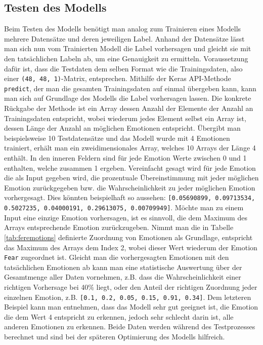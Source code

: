 \documentclass[12pt, a4paper]{report}
\begin{document}
\subsection{Testen des Modells}
Beim Testen des Modells benötigt man analog zum Trainieren eines Modells mehrere Datensätze und deren jeweiligen Label. Anhand der Datensätze lässt man sich nun vom Trainierten Modell die Label vorhersagen und gleicht sie mit den tatsächlichen Labeln ab, um eine Genauigkeit zu ermitteln. Voraussetzung dafür ist, dass die Testdaten dem selben Format wie die Trainingsdaten, also einer \texttt{(48, 48, 1)}-Matrix, entsprechen. Mithilfe der Keras API-Methode \texttt{predict}, der man die gesamten Trainingsdaten auf einmal übergeben kann, kann man sich auf Grundlage des Modells die Label vorhersagen lassen. Die konkrete Rückgabe der Methode ist ein Array dessen Anzahl der Elemente der Anzahl an Trainingsdaten entspricht, wobei wiederum jedes Element selbst ein Array ist, dessen Länge der Anzahl an möglichen Emotionen entspricht. Übergibt man beispielsweise 10 Testdatensätze und das Modell wurde mit 4 Emotionen trainiert, erhält man ein zweidimensionales Array, welches 10 Arrays der Länge 4 enthält. In den inneren Feldern sind für jede Emotion Werte zwischen 0 und 1 enthalten, welche zusammen 1 ergeben. Vereinfacht gesagt wird für jede Emotion die als Input gegeben wird, die prozentuale Übereinstimmung mit jeder möglichen Emotion zurückgegeben bzw. die Wahrscheinlichkeit zu jeder möglichen Emotion vorhergesagt. Dies könnten beispielhaft so aussehen: \texttt{[0.05690899, 0.09713534, 0.5027235,  0.04000191, 0.29613075, 0.00709949]}. Möchte man zu einem Input eine einzige Emotion vorhersagen, ist es sinnvoll, die dem Maximum des Arrays entsprechende Emotion zurückzugeben. Nimmt man die in Tabelle \ref{tab:feremotions} definierte Zuordnung von Emotionen als Grundlage, entspricht das Maximum des Arrays dem Index 2, wobei dieser Wert wiederum der Emotion \texttt{Fear} zugeordnet ist.\newline
Gleicht man die vorhergesagten Emotionen mit den tatsächlichen Emotionen ab kann man eine statistische Auswertung über der Gesamtmenge aller Daten vornehmen, z.B. dass die Wahrscheinlichkeit einer richtigen Vorhersage bei 40\% liegt, oder den Anteil der richtigen Zuordnung jeder einzelnen Emotion, z.B. \texttt{[0.1, 0.2, 0.05, 0.15, 0.91, 0.34]}. Dem letzteren Beispiel kann man entnehmen, dass das Modell sehr gut geeignet ist, die Emotion die dem Wert 4 entspricht zu erkennen, jedoch sehr schlecht darin ist, alle anderen Emotionen zu erkennen. Beide Daten werden während des Testprozesses berechnet und sind bei der späteren Optimierung des Modells hilfreich.
\end{document}
